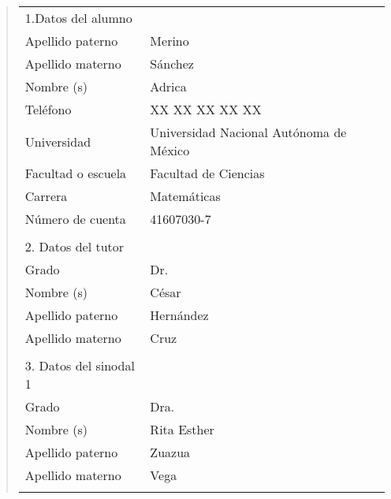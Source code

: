 {\small
\begin{quote}
\begin{tabular}{lll}
1.Datos del alumno          & {}                                          \\
Apellido paterno            & Merino                                     \\
Apellido materno            & S\'anchez                                     \\
Nombre (s)                   & Adrica                                     \\
Tel\'efono                  & XX XX XX XX XX                              \\
Universidad                 & Universidad Nacional Aut\'onoma de M\'exico \\
Facultad o escuela          & Facultad de Ciencias                        \\
Carrera                     & Matem\'aticas                                     \\
N\'umero de cuenta          & 41607030-7                                   \\
{}                          & {}                                          \\
2. Datos del tutor          & {}                                          \\
Grado                       & Dr.                                         \\
Nombre (s)                   & C\'esar                                     \\
Apellido paterno            & Hern\'andez                                 \\
Apellido materno            & Cruz                                        \\
{}                          & {}                                          \\
3. Datos del sinodal 1      & {}                                          \\
Grado                       & Dra.                                        \\
Nombre (s)                   & Rita Esther                                     \\
Apellido paterno            & Zuazua                                     \\
Apellido materno            & Vega                                     \\
{}                          & {}                                          \\

\end{tabular}
\end{quote}}
